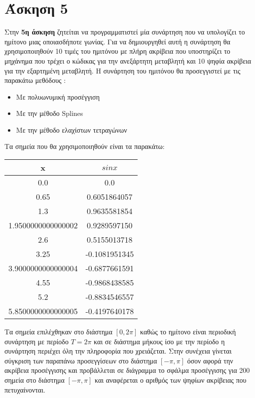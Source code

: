 \documentclass[Second Project.tex]{subfiles}
\begin{document}
\section{ Άσκηση 5 }
Στην \textbf{5η άσκηση} ζητείται να προγραμματιστεί μία συνάρτηση που να υπολογίζει το ημίτονο μιας οποιασδήποτε γωνίας.
Για να δημιουργηθεί αυτή η συνάρτηση θα χρησιμοποιηθούν 10 τιμές του ημιτόνου με πλήρη ακρίβεια που υποστηρίζει το μηχάνημα που τρέχει ο κώδικας
για την ανεξάρτητη μεταβλητή και 10 ψηφία ακρίβεια για την εξαρτημένη μεταβλητή. Η συνάρτηση του ημιτόνου θα προσεγγιστεί με τις παρακάτω 
μεθόδους :
\begin{itemize}
    \item Με πολυωνυμική προσέγγιση
    \item Με την μέθοδο \textlatin{Splines}
    \item Με την μέθοδο ελαχίστων τετραγώνων
\end{itemize}

Τα σημεία που θα χρησιμοποιηθούν είναι τα παρακάτω: 
\begin{center}
    \begin{tabular}{ |c|c| } 
    \hline
    \textlatin{x} & $sinx$ \\ \hline
    0.0 & 0.0 \\ \hline
    0.65 & 0.6051864057 \\ \hline
    1.3 & 0.9635581854 \\  \hline
    1.9500000000000002 & 0.9289597150 \\ \hline
    2.6 & 0.5155013718 \\  \hline
    3.25 & -0.1081951345 \\ \hline
    3.9000000000000004 & -0.6877661591 \\ \hline
    4.55 & -0.9868438585 \\ \hline
    5.2 & -0.8834546557 \\ \hline
    5.8500000000000005 & -0.4197640178 \\
    \hline
    \end{tabular}
\end{center}

Τα σημεία επιλέχθηκαν στο διάστημα $[0,2\pi]$ καθώς το ημίτονο είναι περιοδική συνάρτηση με περίοδο $Τ = 2\pi$ και σε 
διάστημα μήκους ίσο με την περίοδο η συνάρτηση περιέχει όλη την πληροφορία που χρειάζεται.
Στην συνέχεια γίνεται σύγκριση των παραπάνω προσεγγίσεων στο διάστημα $[-\pi , \pi]$ όσον αφορά την ακρίβεια 
προσέγγισης και προβάλλεται σε διάγραμμα το σφάλμα προσέγγισης για 200 σημεία στο διάστημα $[-\pi , \pi]$ και 
αναφέρεται ο αριθμός των ψηφίων ακρίβειας που πετυχαίνονται.
\end{document}
